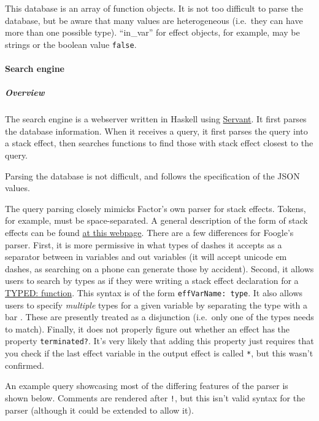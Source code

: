 \documentclass[
]{article}
\begin{document}
This database is an array of function objects. It is not too difficult
to parse the database, but be aware that many values are heterogeneous
(i.e.~they can have more than one possible type). ``in\_var'' for effect
objects, for example, may be strings or the boolean value
\texttt{false}.

\hypertarget{search-engine}{%
\paragraph{Search engine}\label{search-engine}}

\hypertarget{overview}{%
\subparagraph{Overview}\label{overview}}

The search engine is a webserver written in Haskell using
\href{https://www.servant.dev/}{Servant}. It first parses the database
information. When it receives a query, it first parses the query into a
stack effect, then searches functions to find those with stack effect
closest to the query.

Parsing the database is not difficult, and follows the specification of
the JSON values.

The query parsing closely mimicks Factor's own parser for stack effects.
Tokens, for example, must be space-separated. A general description of
the form of stack effects can be found
\href{https://docs.factorcode.org/content/article-effects.html}{at this
webpage}. There are a few differences for Foogle's parser. First, it is
more permissive in what types of dashes it accepts as a separator
between in variables and out variables (it will accept unicode em
dashes, as searching on a phone can generate those by accident). Second,
it allows users to search by types as if they were writing a stack
effect declaration for a
\href{https://docs.factorcode.org/content/word-TYPED__colon__,typed.html}{TYPED:
function}. This syntax is of the form \texttt{effVarName:\ type}. It
also allows users to specify \emph{multiple} types for a given variable
by separating the type with a bar \texttt{\textbar{}}. These are
presently treated as a disjunction (i.e.~only one of the types needs to
match). Finally, it does not properly figure out whether an effect has
the property \texttt{terminated?}. It's very likely that adding this
property just requires that you check if the last effect variable in the
output effect is called \texttt{*}, but this wasn't confirmed.

An example query showcasing most of the differing features of the parser
is shown below. Comments are rendered after \texttt{!}, but this isn't
valid syntax for the parser (although it could be extended to allow it).
\end{document}
